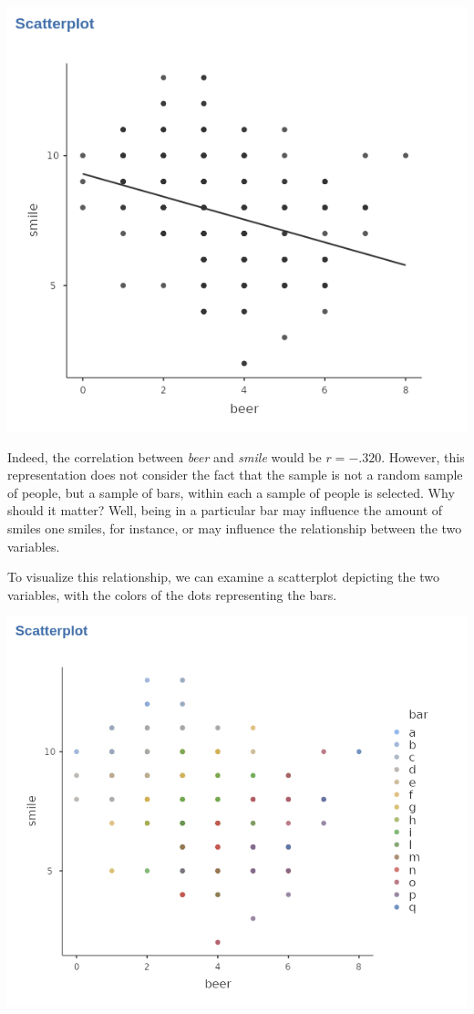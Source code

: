 \documentclass[
]{book}
\begin{document}
\includegraphics[width=0.8\linewidth]{bookletpics/4_theory_plot1}

Indeed, the correlation between \emph{beer} and \emph{smile} would be \(r=-.320\). However, this representation does not consider the fact that the sample is not a random sample of people, but a sample of bars, within each a sample of people is selected. Why should it matter? Well, being in a particular bar may influence the amount of smiles one smiles, for instance, or may influence the relationship between the two variables.

To visualize this relationship, we can examine a scatterplot depicting the two variables, with the colors of the dots representing the bars.

\includegraphics[width=0.8\linewidth]{bookletpics/4_theory_plot2}
\end{document}
